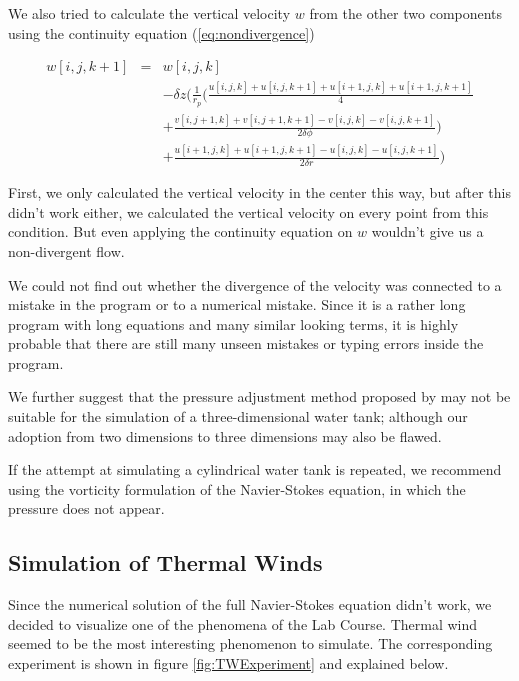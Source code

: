 \documentclass[12pt, a4paper]{article} %
\newcommand{\todoRef}{\todo[color=green!20]}
\begin{document}
			We also tried to calculate the vertical velocity $w$ from the other two components using the continuity equation (\ref{eq:nondivergence})
			
			\begin{eqnarray}
				w[i,j,k+1] &=& w[i,j,k]
				\nonumber \\
				&&- \delta z \Bigg( \frac{1}{r_p}\bigg( \frac{u[i,j,k]+u[i,j,k+1]+u[i+1,j,k]+u[i+1,j,k+1]}{4}
				\nonumber \\
				&&+ \frac{v[i,j+1,k]+v[i,j+1,k+1]-v[i,j,k]-v[i,j,k+1]}{2\delta\phi} \bigg) 
				\nonumber \\
				&&+\frac{u[i+1,j,k]+u[i+1,j,k+1]-u[i,j,k]-u[i,j,k+1]}{2\delta r} \Bigg)
				\label{eq: neues w_c}
			\end{eqnarray}
			
			First, we only calculated the vertical velocity in the center this way, but after this didn't work either, we calculated the vertical velocity on every point from this condition. But even applying the continuity equation on $w$ wouldn't give us a non-divergent flow.
			
			We could not find out whether the divergence of the velocity was connected to a mistake in the program or to a numerical mistake. Since it is a rather long program with long equations and many similar looking terms, it is highly probable that there are still many unseen mistakes or typing errors inside the program.
			
			We further suggest that the pressure adjustment method proposed by \todoRef{fluiddynamik.pdf} may not be suitable for the simulation of a three-dimensional water tank; although our adoption from two dimensions to three dimensions may also be flawed.
			
			If the attempt at simulating a cylindrical water tank is repeated, we recommend using the vorticity formulation of the Navier-Stokes equation, in which the pressure does not appear.
			
			\newpage
			
	\subsection{Simulation of Thermal Winds}
		Since the numerical solution of the full Navier-Stokes equation didn't work, we decided to visualize one of the phenomena of the Lab Course. Thermal wind seemed to be the most interesting phenomenon to simulate. The corresponding experiment is shown in figure \ref{fig:TWExperiment} and explained below.
		
\end{document}
